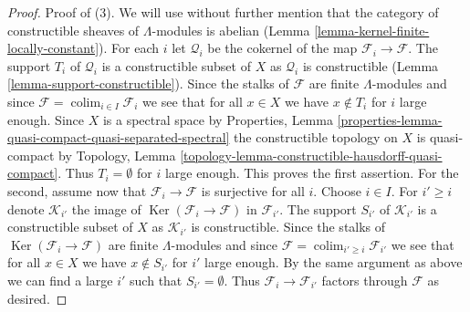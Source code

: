 \documentclass[10pt,a4paper]{amsart}
\theoremstyle{plain}
\theoremstyle{definition}
\theoremstyle{remark}
\numberwithin{equation}{subsection}
\def\colim{\mathop{\mathrm{colim}}\nolimits}
\def\Ker{\mathop{\mathrm{Ker}}}
\begin{document}
\begin{proof}
\medskip\noindent
Proof of (3). We will use without further mention that the category of
constructible sheaves of $\Lambda$-modules is abelian
(Lemma \ref{lemma-kernel-finite-locally-constant}).
For each $i$ let $\mathcal{Q}_i$ be the cokernel of the map
$\mathcal{F}_i \to \mathcal{F}$. The support $T_i$ of $\mathcal{Q}_i$
is a constructible subset of $X$ as $\mathcal{Q}_i$ is constructible
(Lemma \ref{lemma-support-constructible}).
Since the stalks of $\mathcal{F}$ are finite $\Lambda$-modules
and since $\mathcal{F} = \colim_{i \in I} \mathcal{F}_i$ we see
that for all $x \in X$ we have $x \not \in T_i$ for $i$ large enough.
Since $X$ is a spectral space by Properties, Lemma
\ref{properties-lemma-quasi-compact-quasi-separated-spectral}
the constructible topology on $X$ is quasi-compact by
Topology, Lemma \ref{topology-lemma-constructible-hausdorff-quasi-compact}.
Thus $T_i = \emptyset$ for $i$ large enough. This proves the first
assertion. For the second, assume now that
$\mathcal{F}_i \to \mathcal{F}$ is surjective for all $i$.
Choose $i \in I$. For $i' \geq i$ denote $\mathcal{K}_{i'}$ the
image of $\Ker(\mathcal{F}_i \to \mathcal{F})$ in $\mathcal{F}_{i'}$.
The support $S_{i'}$ of $\mathcal{K}_{i'}$
is a constructible subset of $X$ as $\mathcal{K}_{i'}$ is constructible.
Since the stalks of $\Ker(\mathcal{F}_i \to \mathcal{F})$
are finite $\Lambda$-modules and since
$\mathcal{F} = \colim_{i' \geq i} \mathcal{F}_{i'}$ we see
that for all $x \in X$ we have $x \not \in S_{i'}$ for $i'$ large enough.
By the same argument as above we can find a large $i'$ such
that $S_{i'} = \emptyset$. Thus $\mathcal{F}_i \to \mathcal{F}_{i'}$
factors through $\mathcal{F}$ as desired.
\end{proof}
\end{document}
